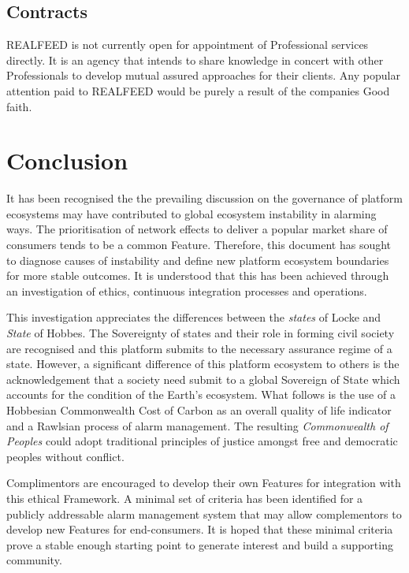 \documentclass[11pt, oneside]{article}   	%
\begin{document}
\subsection{Contracts}
REALFEED is not currently open for appointment of Professional services directly.
It is an agency that intends to share knowledge in concert with other Professionals to develop mutual assured approaches for their clients.
Any popular attention paid to REALFEED would be purely a result of the companies Good faith.

\pagebreak

\section{Conclusion}
It has been recognised the the prevailing discussion on the governance of platform ecosystems may have contributed to global ecosystem instability in alarming ways.
The prioritisation of network effects to deliver a popular market share of consumers tends to be a common Feature.
Therefore, this document has sought to diagnose causes of instability and define new platform ecosystem boundaries for more stable outcomes.
It is understood that this has been achieved through an investigation of ethics, continuous integration processes and operations.\

This investigation appreciates the differences between the \emph{states} of Locke and \emph{State} of Hobbes.
The Sovereignty of states and their role in forming civil society are recognised and this platform submits to the necessary assurance regime of a state.
However, a significant difference of this platform ecosystem to others is the acknowledgement that a society need submit to a global Sovereign of State which accounts for the condition of the Earth's ecosystem.
What follows is the use of a Hobbesian Commonwealth Cost of Carbon as an overall quality of life indicator and a Rawlsian process of alarm management.
The resulting \emph{Commonwealth of Peoples} could adopt traditional principles of justice amongst free and democratic peoples without conflict.\

Complimentors are encouraged to develop their own Features for integration with this ethical Framework.
A minimal set of criteria has been identified for a publicly addressable alarm management system that may allow complementors to develop new Features for end-consumers.
It is hoped that these minimal criteria prove a stable enough starting point to generate interest and build a supporting community.\
\end{document}

